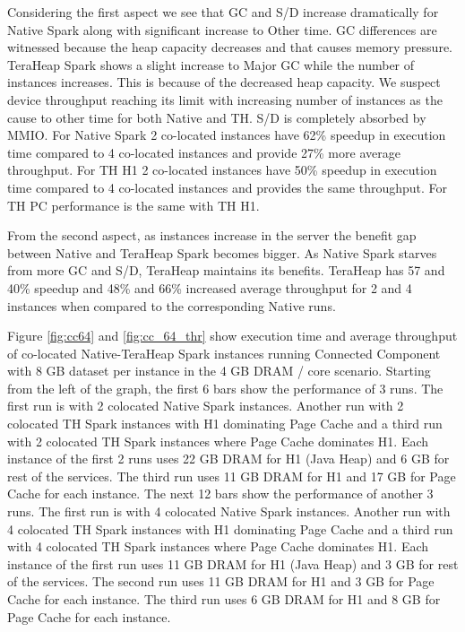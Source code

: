 Considering the first aspect we see that GC and S/D increase dramatically for Native Spark along with significant increase to Other time. GC differences are witnessed because the heap capacity decreases and that causes memory pressure. TeraHeap Spark shows a slight increase to Major GC while the number of instances increases. This is because of the decreased heap capacity. We suspect device throughput reaching its limit with increasing number of instances as the cause to other time for both Native and TH. S/D is completely absorbed by MMIO. For Native Spark 2 co-located instances have 62\% speedup in execution time compared to 4 co-located instances and provide 27\% more average throughput. For TH H1 2 co-located instances have 50\% speedup in execution time compared to 4 co-located instances and provides the same throughput. For TH PC performance is the same with TH H1. 

From the second aspect, as instances increase in the server the benefit gap between Native and TeraHeap Spark becomes bigger. As Native Spark starves from more GC and S/D, TeraHeap maintains its benefits. TeraHeap has 57 and 40\% speedup and 48\% and 66\% increased average throughput for 2 and 4 instances when compared to the corresponding Native runs.

Figure \ref{fig:cc64} and \ref{fig:cc_64_thr} show execution time and average throughput of co-located
Native-TeraHeap Spark instances running Connected Component with 8 GB
dataset per instance in the 4 GB DRAM / core scenario.
Starting from the left of the graph, the first 6 bars show the
performance of 3 runs. The first run is with 2 colocated Native Spark instances.
Another run with 2 colocated TH Spark instances with H1 dominating Page Cache
and a third run with 2 colocated TH Spark instances where Page Cache dominates H1.
Each instance of the first 2 runs uses 22 GB DRAM for H1 (Java Heap) and 6 GB for rest of the services.
The third run uses 11 GB DRAM for H1 and 17 GB for Page Cache for each instance. 
The next 12 bars show the performance of another 3 runs. The first run is with 4 colocated Native Spark instances.
Another run with 4 colocated TH Spark instances with H1 dominating Page Cache
and a third run with 4 colocated TH Spark instances where Page Cache dominates H1.
Each instance of the first run uses 11 GB DRAM for H1 (Java Heap) and 3 GB for rest of the services.
The second run uses 11 GB DRAM for H1 and 3 GB for Page Cache for each instance.
The third run uses 6 GB DRAM for H1 and 8 GB for Page Cache for each instance.

